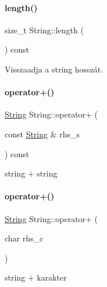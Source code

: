 \mbox{\label{class_string_ad3b888edbfb3bab21d4bae4663d2211a}} 
\paragraph{\texorpdfstring{length()}{length()}}
{\footnotesize\ttfamily size\+\_\+t String\+::length (\begin{DoxyParamCaption}{ }\end{DoxyParamCaption}) const\hspace{0.3cm}{\ttfamily [inline]}}



Visszaadja a string hosszát. 

\mbox{\label{class_string_a28a020f061e5f25317af47488bfb7de8}} 
\paragraph{\texorpdfstring{operator+()}{operator+()}\hspace{0.1cm}{\footnotesize\ttfamily [1/2]}}
{\footnotesize\ttfamily \mbox{\hyperlink{class_string}{String}} String\+::operator+ (\begin{DoxyParamCaption}\item[{const \mbox{\hyperlink{class_string}{String}} \&}]{rhs\+\_\+s }\end{DoxyParamCaption}) const}



string + string 

\mbox{\label{class_string_afa169686af6b513e1f059cf2bf39695f}} 
\paragraph{\texorpdfstring{operator+()}{operator+()}\hspace{0.1cm}{\footnotesize\ttfamily [2/2]}}
{\footnotesize\ttfamily \mbox{\hyperlink{class_string}{String}} String\+::operator+ (\begin{DoxyParamCaption}\item[{char}]{rhs\+\_\+c }\end{DoxyParamCaption})\hspace{0.3cm}{\ttfamily [inline]}}



string + karakter 

